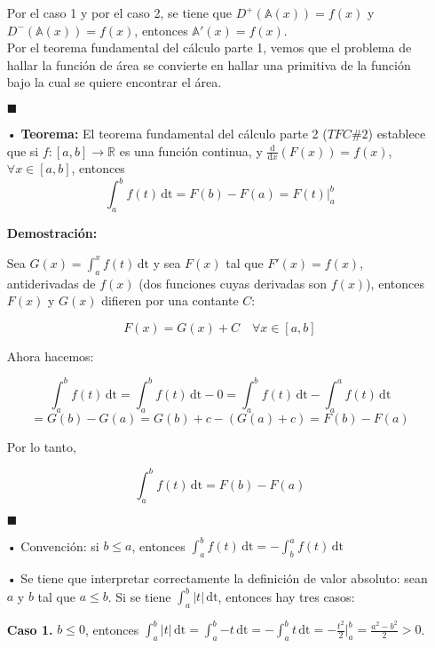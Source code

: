 \documentclass[pts12]{article}
\numberwithin{equation}{section}
\newcommand{\Col}{\color{ProcessBlue}}
\newcommand{\derivate}[2]{\frac{\mathrm{d}}{\mathrm{d}#1} \left(  {#2}  \right)  }
\begin{document}
\begin{itemize}
Por el caso 1 y por el caso 2, se tiene que $D^+(\mathbb{A}(x))=f(x)$ y $D^-(\mathbb{A}(x))=f(x)$, entonces $\mathbb{A}'(x)=f(x)$. \\

	Por el teorema fundamental del cálculo parte 1, vemos que el problema de hallar la función de área se convierte en hallar una primitiva de la función bajo la cual se quiere encontrar el área. 
	
\begin{flushright}
$\blacksquare$
\end{flushright}	

\item[\Col •] \textbf{Teorema:} El teorema fundamental del cálculo parte 2 ($TFC \#2$) establece que si $f:[a,b]\longrightarrow\mathbb{R}$ es una función continua, y $\derivate{x}{F(x)}=f(x)$, $\forall x\in [a,b]$, entonces 
$$ \int_{a}^{b} \! {f(t)} \, \mathrm{dt}=F(b)-F(a)=F(t) \Big|_a^b $$ 

\textbf{Demostración:}

Sea $G(x)=\int_{a}^{x} \! {f(t)} \, \mathrm{dt}$ y sea $F(x)$ tal que $F'(x)=f(x)$, antiderivadas de $f(x)$ (dos funciones cuyas derivadas son $f(x)$), entonces $F(x)$ y $G(x)$ difieren por una contante $C$:

$$ F(x)=G(x)+C \quad \forall x\in [a,b] $$

Ahora hacemos:

$$\int_{a}^{b} \! {f(t)} \, \mathrm{dt}=\int_{a}^{b} \! {f(t)} \, \mathrm{dt}-0=\int_{a}^{b} \! {f(t)} \, \mathrm{dt}- \int_{a}^{a} \! {f(t)} \, \mathrm{dt}$$
$$=G(b)-G(a)=G(b)+c-(G(a)+c)=F(b)-F(a)$$

Por lo tanto, 

$$ \int_{a}^{b} \! {f(t)} \, \mathrm{dt}=F(b)-F(a) $$

\begin{flushright}
$\blacksquare$
\end{flushright}

\item[\Col •] Convención: si $b\leq a$, entonces $\int_{a}^{b} \! {f(t)} \, \mathrm{dt}=-\int_{b}^{a} \! {f(t)} \, \mathrm{dt}$

\item[\Col •] Se tiene que interpretar correctamente la definición de valor absoluto:  sean $a$ y $b$ tal que $a\leq b$. Si se tiene $\int_{a}^{b} \! {|t|} \, \mathrm{dt}$, entonces hay tres casos:

\textbf{Caso 1.} $b\leq 0$, entonces $\int_{a}^{b} \! {|t|} \, \mathrm{dt}=\int_{a}^{b} \! {-t} \, \mathrm{dt}=-\int_{a}^{b} \! {t} \, \mathrm{dt}=-\frac{t^2}{2}\Big|_a^b=\frac{a^2-b^2}{2}>0$.


\end{itemize}
\end{document}
